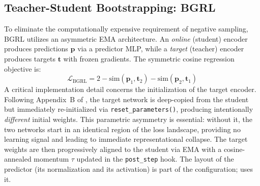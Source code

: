 \documentclass[conference]{IEEEtran}
\begin{document}
\subsection{Teacher-Student Bootstrapping: BGRL}
To eliminate the computationally expensive requirement of negative sampling, BGRL \cite{bgrl} utilizes an asymmetric EMA architecture. An \textit{online} (student) encoder produces predictions $\bm{p}$ via a predictor MLP, while a \textit{target} (teacher) encoder produces targets $\bm{t}$ with frozen gradients. The symmetric cosine regression objective is:
\begin{equation}
\mathcal{L}_{\text{BGRL}} = 2 - \text{sim}(\bm{p}_1, \bm{t}_2) - \text{sim}(\bm{p}_2, \bm{t}_1)
\end{equation}
A critical implementation detail concerns the initialization of the target encoder. Following Appendix~B of \cite{bgrl}, the target network is deep-copied from the student but immediately re-initialized via \texttt{reset\_parameters()}, producing intentionally \textit{different} initial weights. This parametric asymmetry is essential: without it, the two networks start in an identical region of the loss landscape, providing no learning signal and leading to immediate representational collapse. The target weights are then progressively aligned to the student via EMA with a cosine-annealed momentum $\tau$ updated in the \texttt{post\_step} hook. The layout of the predictor (its normalization and its activation) is part of the configuration;  uses it.
\end{document}
